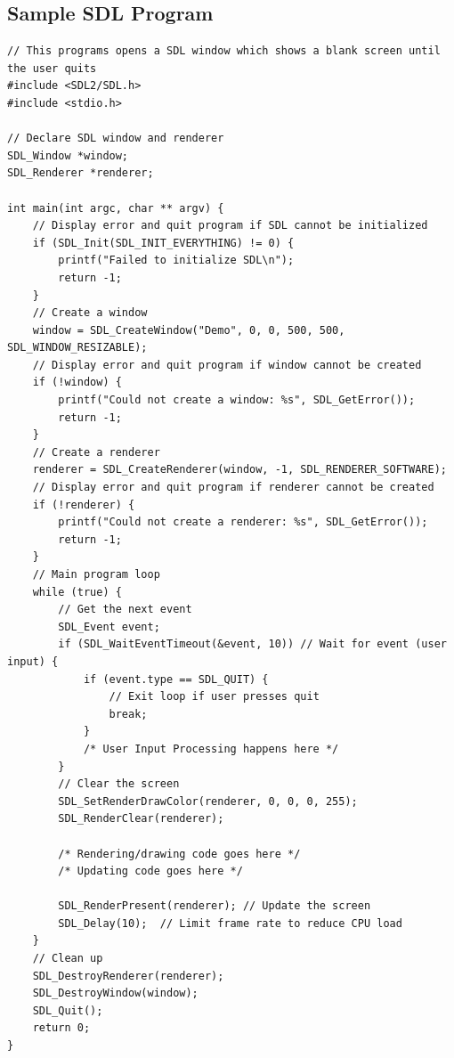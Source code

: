 \documentclass[report]{subfiles}
\begin{document}
    \subsection{Sample SDL Program}
    \begin{lstlisting}
// This programs opens a SDL window which shows a blank screen until the user quits
#include <SDL2/SDL.h>
#include <stdio.h>

// Declare SDL window and renderer
SDL_Window *window;
SDL_Renderer *renderer;

int main(int argc, char ** argv) {
    // Display error and quit program if SDL cannot be initialized
    if (SDL_Init(SDL_INIT_EVERYTHING) != 0) {
        printf("Failed to initialize SDL\n");
        return -1;
    }
    // Create a window
    window = SDL_CreateWindow("Demo", 0, 0, 500, 500, SDL_WINDOW_RESIZABLE);
    // Display error and quit program if window cannot be created
    if (!window) {
        printf("Could not create a window: %s", SDL_GetError());
        return -1;
    }
    // Create a renderer
    renderer = SDL_CreateRenderer(window, -1, SDL_RENDERER_SOFTWARE);
    // Display error and quit program if renderer cannot be created
    if (!renderer) {
        printf("Could not create a renderer: %s", SDL_GetError());
        return -1;
    }
    // Main program loop
    while (true) {
        // Get the next event
        SDL_Event event;
        if (SDL_WaitEventTimeout(&event, 10)) // Wait for event (user input) {
            if (event.type == SDL_QUIT) {
                // Exit loop if user presses quit
                break;
            }
	        /* User Input Processing happens here */
        }
        // Clear the screen
        SDL_SetRenderDrawColor(renderer, 0, 0, 0, 255);
        SDL_RenderClear(renderer);

        /* Rendering/drawing code goes here */
        /* Updating code goes here */

        SDL_RenderPresent(renderer); // Update the screen
        SDL_Delay(10);	// Limit frame rate to reduce CPU load
    }
    // Clean up
    SDL_DestroyRenderer(renderer);
    SDL_DestroyWindow(window);
    SDL_Quit();
    return 0;
}
\end{lstlisting}
\end{document}
